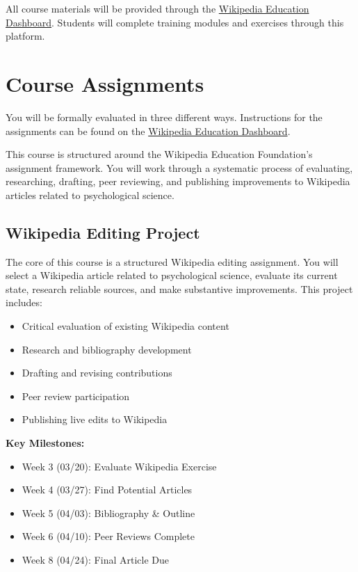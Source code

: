 \documentclass[
]{book}
\providecommand{\tightlist}{%
  \setlength{\itemsep}{0pt}\setlength{\parskip}{0pt}}
\begin{document}
All course materials will be provided through the \href{https://dashboard.wikiedu.org/}{Wikipedia Education Dashboard}. Students will complete training modules and exercises through this platform.

\section*{Course Assignments}\label{course-assignments-4}


You will be formally evaluated in three different ways. Instructions for the assignments can be found on the \href{https://dashboard.wikiedu.org/}{Wikipedia Education Dashboard}.

This course is structured around the Wikipedia Education Foundation's assignment framework. You will work through a systematic process of evaluating, researching, drafting, peer reviewing, and publishing improvements to Wikipedia articles related to psychological science.

\subsection*{Wikipedia Editing Project}\label{wikipedia-editing-project}


The core of this course is a structured Wikipedia editing assignment. You will select a Wikipedia article related to psychological science, evaluate its current state, research reliable sources, and make substantive improvements. This project includes:

\begin{itemize}
\tightlist
\item
  Critical evaluation of existing Wikipedia content
\item
  Research and bibliography development
\item
  Drafting and revising contributions
\item
  Peer review participation
\item
  Publishing live edits to Wikipedia
\end{itemize}

\textbf{Key Milestones:}

\begin{itemize}
\tightlist
\item
  Week 3 (03/20): Evaluate Wikipedia Exercise
\item
  Week 4 (03/27): Find Potential Articles
\item
  Week 5 (04/03): Bibliography \& Outline
\item
  Week 6 (04/10): Peer Reviews Complete
\item
  Week 8 (04/24): Final Article Due
\end{itemize}
\end{document}
